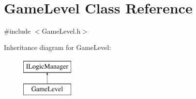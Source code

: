 \hypertarget{class_game_level}{}\section{Game\+Level Class Reference}
\label{class_game_level}


{\ttfamily \#include $<$Game\+Level.\+h$>$}

Inheritance diagram for Game\+Level\+:\begin{figure}[H]
\begin{center}
\leavevmode
\includegraphics[height=2.000000cm]{class_game_level}
\end{center}
\end{figure}
